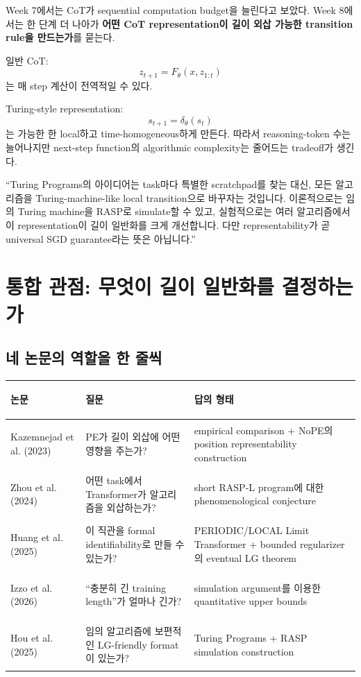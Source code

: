 \documentclass[11pt,a4paper,oneside,openany]{memoir}
\theoremstyle{definition}
\begin{document}
Week 7에서는 CoT가 sequential computation budget을 늘린다고 보았다.
Week 8에서는 한 단계 더 나아가 \textbf{어떤 CoT representation이 길이 외삽 가능한 transition rule을 만드는가}를 묻는다.

일반 CoT:
\[
z_{t+1}=F_\theta(x,z_{1:t})
\]
는 매 step 계산이 전역적일 수 있다.

Turing-style representation:
\[
s_{t+1}=\delta_\theta(s_t)
\]
는 가능한 한 local하고 time-homogeneous하게 만든다.
따라서 reasoning-token 수는 늘어나지만 next-step function의 algorithmic complexity는 줄어드는 tradeoff가 생긴다.

\begin{presentbox}
``Turing Programs의 아이디어는 task마다 특별한 scratchpad를 찾는 대신, 모든 알고리즘을 Turing-machine-like local transition으로 바꾸자는 것입니다. 이론적으로는 임의 Turing machine을 RASP로 simulate할 수 있고, 실험적으로는 여러 알고리즘에서 이 representation이 길이 일반화를 크게 개선합니다. 다만 representability가 곧 universal SGD guarantee라는 뜻은 아닙니다.''
\end{presentbox}

\chapter{통합 관점: 무엇이 길이 일반화를 결정하는가}

\section{네 논문의 역할을 한 줄씩}

\begin{center}
\small
\begin{tabularx}{\textwidth}{>{\bfseries\raggedright\arraybackslash}p{}Y Y}
\toprule
논문 & 질문 & 답의 형태 \\
\midrule
Kazemnejad et al. (2023) & PE가 길이 외삽에 어떤 영향을 주는가? & empirical comparison + NoPE의 position representability construction \\
Zhou et al. (2024) & 어떤 task에서 Transformer가 알고리즘을 외삽하는가? & short RASP-L program에 대한 phenomenological conjecture \\
Huang et al. (2025) & 이 직관을 formal identifiability로 만들 수 있는가? & PERIODIC/LOCAL Limit Transformer + bounded regularizer의 eventual LG theorem \\
Izzo et al. (2026) & ``충분히 긴 training length''가 얼마나 긴가? & simulation argument를 이용한 quantitative upper bounds \\
Hou et al. (2025) & 임의 알고리즘에 보편적인 LG-friendly format이 있는가? & Turing Programs + RASP simulation construction \\
\bottomrule
\end{tabularx}
\end{center}
\end{document}
